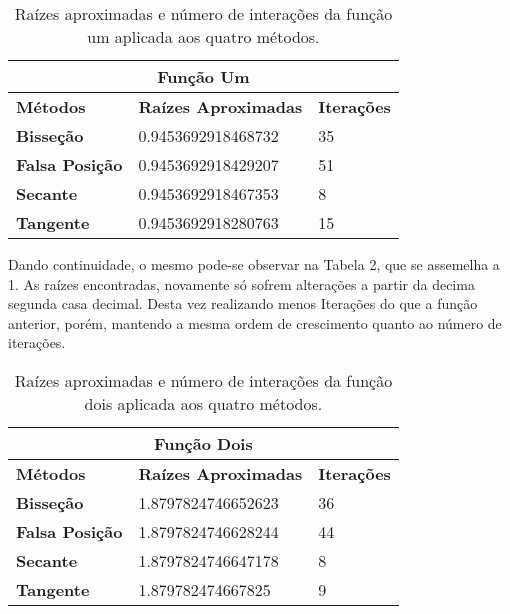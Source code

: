 \documentclass[12pt]{article}
\begin{document}
\begin{table}[!h]
\begin{center}
\begin{tabular}{lll}
\multicolumn{3}{c}{\textbf{Função Um}}                                                                              \\ \hline
\multicolumn{1}{l|}{\textbf{Métodos}}       & \multicolumn{1}{l|}{\textbf{Raízes Aproximadas}} & \textbf{Iterações} \\ \hline
\multicolumn{1}{l|}{\textbf{Bisseção}}      & \multicolumn{1}{l|}{0.9453692918468732}          & 35                 \\ \hline
\multicolumn{1}{l|}{\textbf{Falsa Posição}} & \multicolumn{1}{l|}{0.9453692918429207}          & 51                 \\ \hline
\multicolumn{1}{l|}{\textbf{Secante}}       & \multicolumn{1}{l|}{0.9453692918467353}          & 8                  \\ \hline
\multicolumn{1}{l|}{\textbf{Tangente}}      & \multicolumn{1}{l|}{0.9453692918280763}          & 15                
\end{tabular}
    \caption{Raízes aproximadas e número de interações da função um aplicada aos quatro métodos.}
\end{center}
\end{table}

Dando continuidade, o mesmo pode-se observar na Tabela 2, que se assemelha a 1. As raízes encontradas, novamente só sofrem alterações a partir da decima segunda casa decimal. Desta vez realizando menos Iterações do que a função anterior, porém, mantendo a mesma ordem de crescimento quanto ao número de iterações.

\begin{table}[!h]
\begin{center}
\begin{tabular}{lll}
\multicolumn{3}{c}{\textbf{Função Dois}}                                                                            \\ \hline
\multicolumn{1}{l|}{\textbf{Métodos}}       & \multicolumn{1}{l|}{\textbf{Raízes Aproximadas}} & \textbf{Iterações} \\ \hline
\multicolumn{1}{l|}{\textbf{Bisseção}}      & \multicolumn{1}{l|}{1.8797824746652623}          & 36                 \\ \hline
\multicolumn{1}{l|}{\textbf{Falsa Posição}} & \multicolumn{1}{l|}{1.8797824746628244}          & 44                 \\ \hline
\multicolumn{1}{l|}{\textbf{Secante}}       & \multicolumn{1}{l|}{1.8797824746647178}          & 8                  \\ \hline
\multicolumn{1}{l|}{\textbf{Tangente}}      & \multicolumn{1}{l|}{1.879782474667825}           & 9
\end{tabular}
\end{center}
    \caption{Raízes aproximadas e número de interações da função dois aplicada aos quatro métodos.}
\end{table}
\end{document}
